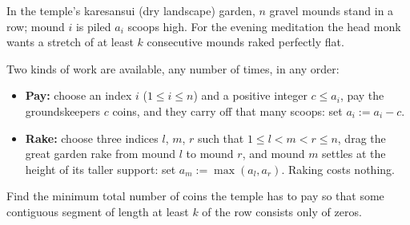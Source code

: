 In the temple's karesansui (dry landscape) garden, $n$ gravel mounds stand in a row; mound $i$ is piled $a_i$ scoops high. For the evening meditation the head monk wants a stretch of at least $k$ consecutive mounds raked perfectly flat.

Two kinds of work are available, any number of times, in any order:

\begin{itemize}
  \item \textbf{Pay:} choose an index $i$ ($1 \le i \le n$) and a positive integer $c \le a_i$, pay the groundskeepers $c$ coins, and they carry off that many scoops: set $a_i := a_i - c$.
  \item \textbf{Rake:} choose three indices $l$, $m$, $r$ such that $1 \le l < m < r \le n$, drag the great garden rake from mound $l$ to mound $r$, and mound $m$ settles at the height of its taller support: set $a_m := \max(a_l, a_r)$. Raking costs nothing.
\end{itemize}

Find the minimum total number of coins the temple has to pay so that some contiguous segment of length at least $k$ of the row consists only of zeros.
